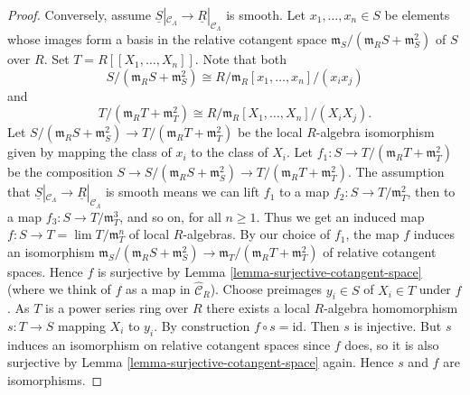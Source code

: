 \begin{proof}
\medskip\noindent
Conversely, assume
$\underline{S}|_{\mathcal{C}_\Lambda} \to \underline{R}|_{\mathcal{C}_\Lambda}$
is smooth. Let $x_1, \ldots, x_n \in S$ be elements whose images
form a basis in the relative cotangent space
$\mathfrak m_S/(\mathfrak m_R S + \mathfrak m_S^2)$ of $S$ over $R$.
Set $T = R[[X_1, \ldots, X_n]]$. Note that both
$$
S/(\mathfrak m_R S + \mathfrak m_S^2) \cong
R/\mathfrak m_R[x_1, \ldots, x_n]/(x_ix_j)
$$
and
$$
T/(\mathfrak m_R T + \mathfrak m_T^2) \cong
R/\mathfrak m_R[X_1, \ldots, X_n]/(X_iX_j).
$$
Let
$S/(\mathfrak m_R S + \mathfrak m_S^2) \to
T/(\mathfrak m_R T + \mathfrak m_T^2)$
be the local $R$-algebra isomorphism given by mapping
the class of $x_i$ to the class of $X_i$. Let
$f_1 : S \to T/(\mathfrak m_R T + \mathfrak m_T^2)$ be the
composition
$S \to S/(\mathfrak m_R S + \mathfrak m_S^2)
\to T/(\mathfrak m_R T + \mathfrak m_T^2)$.
The assumption that
$\underline{S}|_{\mathcal{C}_\Lambda} \to \underline{R}|_{\mathcal{C}_\Lambda}$
is smooth means we can lift $f_1$ to a map
$f_2 : S \to T/\mathfrak{m}_T^2$, then to a map
$f_3 : S \to T/\mathfrak{m}_T^3$, and so on, for all $n \geq 1$. Thus
we get an induced map $f : S \to T = \lim T/\mathfrak m_T^n$
of local $R$-algebras. By our choice of $f_1$, the map $f$ induces an
isomorphism
$\mathfrak m_S/(\mathfrak m_R S + \mathfrak m_S^2) \to
\mathfrak m_T/(\mathfrak m_R T + \mathfrak m_T^2)$
of relative cotangent spaces.
Hence $f$ is surjective by
Lemma \ref{lemma-surjective-cotangent-space}
(where we think of $f$ as a map in $\widehat{\mathcal{C}}_R$).
Choose preimages $y_i \in S$ of $X_i \in T$ under $f$. As $T$ is a
power series ring over $R$ there exists a local
$R$-algebra homomorphism $s : T \to S$ mapping $X_i$ to $y_i$.
By construction $f \circ s = \text{id}$. Then $s$ is injective.
But $s$ induces an isomorphism on relative cotangent spaces since
$f$ does, so it is also surjective by
Lemma \ref{lemma-surjective-cotangent-space}
again. Hence $s$ and $f$ are isomorphisms.
\end{proof}